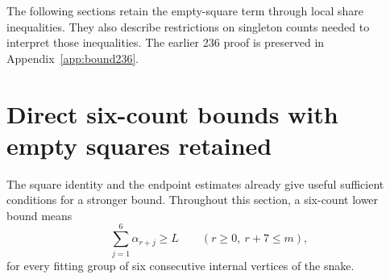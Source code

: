 \documentclass[11pt,a4paper]{article}
\theoremstyle{definition}
\theoremstyle{remark}
\begin{document}
The following sections retain the empty-square term through local share inequalities. They also describe restrictions on singleton counts needed to interpret those inequalities. The earlier 236 proof is preserved in Appendix~\ref{app:bound236}.

\section{Direct six-count bounds with empty squares retained}\label{sec:six-direct}
The square identity and the endpoint estimates already give useful sufficient
conditions for a stronger bound. Throughout this section, a six-count lower
bound means
\[
\sum_{j=1}^{6}\alpha_{r+j}\ge L\qquad(r\ge0,\ r+7\le m),
\]
for every fitting group of six consecutive internal vertices of the snake.
\end{document}
